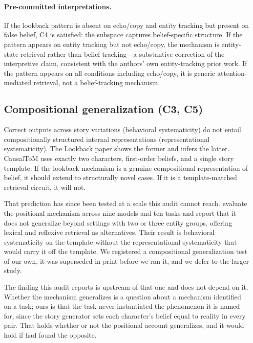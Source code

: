 \documentclass{article}
\begin{document}
\paragraph{Pre-committed interpretations.} If the lookback pattern is absent on echo/copy and entity tracking but present on false belief, C4 is satisfied: the subspace captures belief-specific structure. If the pattern appears on entity tracking but not echo/copy, the mechanism is entity-state retrieval rather than belief tracking---a substantive correction of the interpretive claim, consistent with the authors' own entity-tracking prior work. If the pattern appears on all conditions including echo/copy, it is generic attention-mediated retrieval, not a belief-tracking mechanism.

\subsection{Compositional generalization (C3, C5)}
\label{sec:composition}

Correct outputs across story variations (behavioral systematicity) do not entail compositionally structured internal representations (representational systematicity). The Lookback paper shows the former and infers the latter. CausalToM uses exactly two characters, first-order beliefs, and a single story template. If the lookback mechanism is a genuine compositional representation of belief, it should extend to structurally novel cases. If it is a template-matched retrieval circuit, it will not.

That prediction has since been tested at a scale this audit cannot reach.
\citet{gurarieh2025mixing} evaluate the positional mechanism across nine models and ten
tasks and report that it does not generalize beyond settings with two or three entity
groups, offering lexical and reflexive retrieval as alternatives. Their result is behavioral
systematicity on the template without the representational systematicity that would carry
it off the template. We registered a compositional generalization test of our own, it was
superseded in print before we ran it, and we defer to the larger study.

The finding this audit reports is upstream of that one and does not depend on it. Whether
the mechanism generalizes is a question about a mechanism identified on a task; ours is that
the task never instantiated the phenomenon it is named for, since the story generator sets
each character's belief equal to reality in every pair. That holds whether or not the
positional account generalizes, and it would hold if \citet{gurarieh2025mixing} had found
the opposite.
\end{document}
